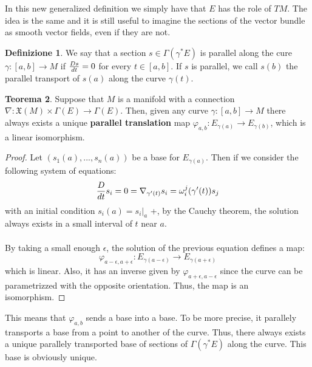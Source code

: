 \documentclass[12pt,a4paper]{report}
\theoremstyle{definition}
\newtheorem{Def}{Definizione}[chapter]
\theoremstyle{Theorem}
\newtheorem{Theo}[Def]{Teorema}
\theoremstyle{definition}
\theoremstyle{definition}
\theoremstyle{definition}
\begin{document}
			In this new generalized definition we simply have that $E$ has the role of $TM$. The idea is the same and it is still useful to imagine the sections of the vector bundle as smooth vector fields, even if they are not.
			\begin{Def}
				We say that a section $s\in\Gamma(\gamma^*E)$ is parallel along the cure $\gamma:[a,b]\rightarrow M$ if ${Ds\over dt}=0$ for every $t\in[a,b]$. If $s$ is parallel, we call $s(b)$ the parallel transport of $s(a)$ along the curve $\gamma(t)$.
			\end{Def}
			\begin{Theo}
				Suppose that $M$ is a manifold with a connection $\nabla:\mathfrak{X}(M)\times\Gamma(E)\rightarrow\Gamma(E)$. Then, given any curve $\gamma:[a,b]\rightarrow M$ there always exists a unique \textbf{parallel translation} map $\varphi_{a,b}:E_{\gamma(a)}\rightarrow E_{\gamma(b)}$, which is a linear isomorphism.
			\end{Theo}
			\begin{proof}
				Let $(s_1(a),...,s_n(a))$ be a base for $E_{\gamma(a)}$. Then if we consider the following system of equations:
				$${D\over dt}s_i=0=\nabla_{\gamma'(t)}s_i=\omega^j_i(\gamma'(t))s_j$$
				with an initial condition $s_i(a)=s_{i}\bigg|_a$ +, by the Cauchy theorem, the solution always exists in a small interval of $t$ near $a$.\\
				\\
				By taking a small enough $\epsilon$, the solution of the previous equation defines a map:
				$$\varphi_{a-\epsilon,a+\epsilon}:E_{\gamma(a-\epsilon)}\rightarrow E_{\gamma(a+\epsilon)}$$ which is linear. Also, it has an inverse given by $\varphi_{a+\epsilon,a-\epsilon}$ since the curve can be parametrizzed with the opposite orientation. Thus, the map is an isomorphism.
			\end{proof}
			This means that $\varphi_{a,b}$ sends a base into a base. To be more precise, it parallely transports a base from a point to another of the curve. Thus, there always exists a unique parallely transported base of sections of $\Gamma(\gamma^*E)$ along the curve. This base is obviously unique.
\end{document}
